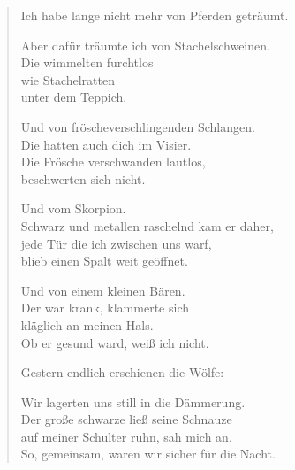 
\cleartorecto


\begin{verse}
Ich habe lange nicht mehr von Pferden geträumt.

Aber dafür träumte ich von Stachelschweinen.\\
Die wimmelten furchtlos\\
wie Stachelratten\\
unter dem Teppich.

Und von fröscheverschlingenden Schlangen.\\
Die hatten auch dich im Visier.\\
Die Frösche verschwanden lautlos,\\
beschwerten sich nicht.

Und vom Skorpion.\\
Schwarz und metallen raschelnd kam er daher,\\
jede Tür die ich zwischen uns warf,\\
blieb einen Spalt weit geöffnet.

Und von einem kleinen Bären.\\
Der war krank, klammerte sich\\
kläglich an meinen Hals.\\
Ob er gesund ward, weiß ich nicht.

Gestern endlich erschienen die Wölfe:

Wir lagerten uns still in die Dämmerung.\\
Der große schwarze ließ seine Schnauze\\
auf meiner Schulter ruhn, sah mich an.\\
So, gemeinsam, waren wir sicher für die Nacht.
\end{verse}

\cleartoverso


